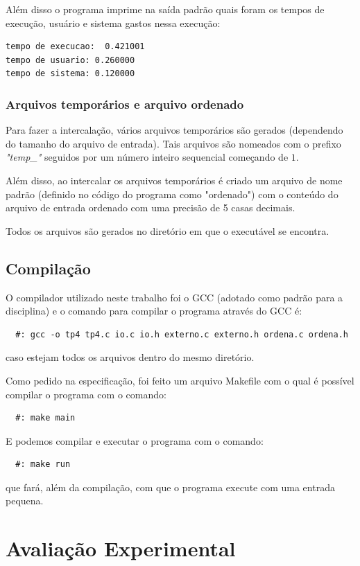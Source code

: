 \documentclass[12pt]{article}
\begin{document}
Além disso o programa imprime na saída padrão quais foram os tempos de execução, usuário e sistema
gastos nessa execução:
\begin{verbatim}
tempo de execucao:  0.421001
tempo de usuario: 0.260000
tempo de sistema: 0.120000
\end{verbatim}

\subsubsection{Arquivos temporários e arquivo ordenado}
Para fazer a intercalação, vários arquivos temporários são gerados (dependendo do tamanho do arquivo
de entrada). Tais arquivos são nomeados com o prefixo \textit{"temp\_"} seguidos por um número inteiro
sequencial começando de $1$.

Além disso, ao intercalar os arquivos temporários é criado um arquivo de nome padrão (definido no código
do programa como "ordenado") com o conteúdo do arquivo de entrada ordenado com uma precisão de 5 casas decimais.

Todos os arquivos são gerados no diretório em que o executável se encontra.

\subsection{Compilação}
O compilador utilizado neste trabalho foi o GCC (adotado como padrão para a disciplina) e 
o comando para compilar o programa através do GCC é:
\begin{verbatim}
  #: gcc -o tp4 tp4.c io.c io.h externo.c externo.h ordena.c ordena.h
\end{verbatim}
caso estejam todos os arquivos dentro do mesmo diretório.

Como pedido na especificação, foi feito um arquivo Makefile com o qual é possível compilar
o programa com o comando: 
\begin{verbatim}
  #: make main
\end{verbatim}

E podemos compilar e executar o programa com o comando:
\begin{verbatim}
  #: make run
\end{verbatim}
que fará, além da compilação, com que o programa execute com uma entrada pequena.

\section{Avaliação Experimental}
\label{avaliacao_experimental}
\end{document}
